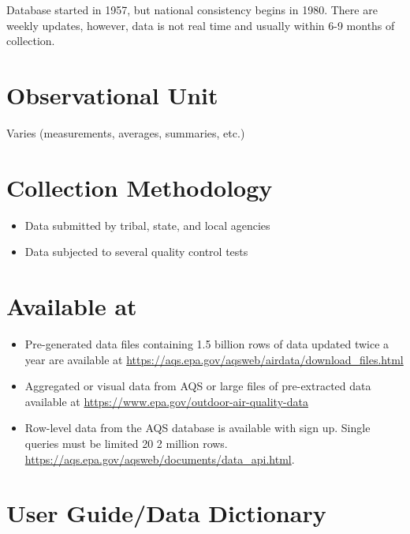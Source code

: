 \documentclass[
]{book}
\providecommand{\tightlist}{%
  \setlength{\itemsep}{0pt}\setlength{\parskip}{0pt}}
\begin{document}
Database started in 1957, but national consistency begins in 1980. There are weekly updates, however, data is not real time and usually within 6-9 months of collection.

\hypertarget{observational-unit}{%
\section{Observational Unit}\label{observational-unit}}

Varies (measurements, averages, summaries, etc.)

\hypertarget{collection-methodology}{%
\section{Collection Methodology}\label{collection-methodology}}

\begin{itemize}
\tightlist
\item
  Data submitted by tribal, state, and local agencies
\item
  Data subjected to several quality control tests
\end{itemize}

\hypertarget{available-at}{%
\section{Available at}\label{available-at}}

\begin{itemize}
\tightlist
\item
  Pre-generated data files containing 1.5 billion rows of data updated twice a year are available at \url{https://aqs.epa.gov/aqsweb/airdata/download_files.html}
\item
  Aggregated or visual data from AQS or large files of pre-extracted data available at \url{https://www.epa.gov/outdoor-air-quality-data}
\item
  Row-level data from the AQS database is available with sign up. Single queries must be limited 20 2 million rows. \url{https://aqs.epa.gov/aqsweb/documents/data_api.html}.
\end{itemize}

\hypertarget{user-guidedata-dictionary}{%
\section{User Guide/Data Dictionary}\label{user-guidedata-dictionary}}
\end{document}
